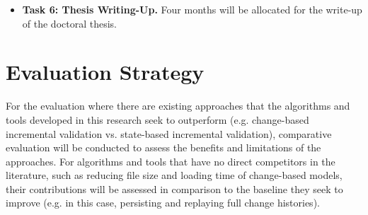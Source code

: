\documentclass[12pt, a4paper]{report} \usepackage[titletoc]{appendix}
\begin{document}
\begin{itemize}
	\item \textbf{Task 6: Thesis Writing-Up.} Four months will be allocated for the write-up of the doctoral thesis.  
\end{itemize}

\chapter{Evaluation Strategy}
\label{ch:evaluation_strategy}
 For the evaluation where there are existing approaches that the algorithms and tools developed in this research seek to outperform (e.g. change-based incremental validation vs. state-based incremental validation), comparative evaluation will be conducted to assess the benefits and limitations of the approaches. For algorithms and tools that have no direct competitors in the literature, such as reducing file size and loading time of change-based models, their contributions will be assessed in comparison to the baseline they seek to improve (e.g. in this case, persisting and replaying full change histories).  
\end{document}

